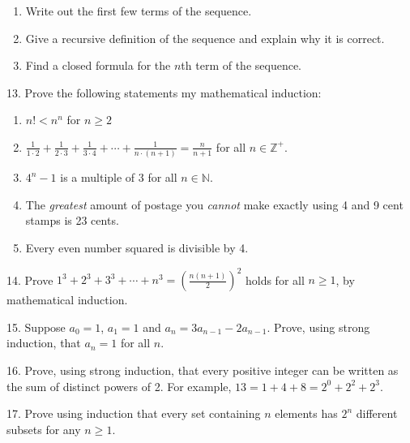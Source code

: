 \documentclass[10pt,]{book}
\theoremstyle{plain}
\theoremstyle{definition}
\numberwithin{equation}{chapter}
\def\d{\displaystyle}
\def\N{\mathbb N}
\def\Z{\mathbb Z}
\newcommand{\lt}{ < }
\begin{document}
\begin{exerciselist}
\begin{enumerate}[label=(\alph*)]
\item\hypertarget{li-618}{}
                Write out the first few terms of the sequence.
\item\hypertarget{li-619}{}
                Give a recursive definition of the sequence and explain why it is correct.
\item\hypertarget{li-620}{}
                Find a closed formula for the \(n\)th term of the sequence.
\end{enumerate}
\par\smallskip
\item[13.]\hypertarget{exercise-221}{}
            Prove the following statements my mathematical induction:
\leavevmode%
\begin{enumerate}[label=(\alph*)]
\item\hypertarget{li-624}{}\(n! \lt  n^n\) for \(n \ge 2\)%
\item\hypertarget{li-625}{}\(\d\frac{1}{1\cdot 2} + \frac{1}{2\cdot 3} +\frac{1}{3\cdot 4}+\cdots + \frac{1}{n\cdot(n+1)} = \d\frac{n}{n+1}\) for all \(n \in \Z^+\).%
\item\hypertarget{li-626}{}\(4^n - 1\) is a multiple of 3 for all \(n \in \N\).%
\item\hypertarget{li-627}{}
                The \emph{greatest} amount of postage you \emph{cannot} make exactly using 4 and 9 cent stamps is 23 cents.
\item\hypertarget{li-628}{}
                Every even number squared is divisible by 4.
\end{enumerate}
\par\smallskip
\item[14.]\hypertarget{exercise-222}{}
            Prove \(1^3 + 2^3 + 3^3 + \cdots + n^3 = \left(\frac{n(n+1)}{2}\right)^2\) holds for all \(n \ge 1\), by mathematical induction.
\par\smallskip
\item[15.]\hypertarget{exercise-223}{}
            Suppose \(a_0 = 1\), \(a_1 = 1\) and \(a_n = 3a_{n-1} - 2a_{n-1}\). Prove, using strong induction, that \(a_n = 1\) for all \(n\).
\par\smallskip
\item[16.]\hypertarget{exercise-224}{}
            Prove, using strong induction, that every positive integer can be written as the sum of distinct powers of 2. For example, \(13 = 1 + 4 + 8 = 2^0 + 2^2 + 2^3\).
\par\smallskip
\item[17.]\hypertarget{exercise-225}{}
            Prove using induction that every set containing \(n\) elements has \(2^n\) different subsets for any \(n \ge 1\).
\par\smallskip
\end{exerciselist}
\typeout{************************************************}
\typeout{************************************************}
\end{document}
